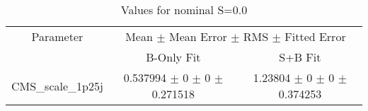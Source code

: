 \begin{table}
\centering
\caption{Values for nominal S=0.0}
\begin{tabular}{ccc}
\toprule
Parameter & \multicolumn{2}{c}{Mean $\pm$ Mean Error $\pm$ RMS $\pm$ Fitted Error}\\
 & B-Only Fit & S+B Fit\\
\midrule
CMS\_scale\_1p25j & \num{0.537994} $\pm$ \num{0} $\pm$ \num{0} $\pm$ \num{0.271518} & \num{1.23804} $\pm$ \num{0} $\pm$ \num{0} $\pm$ \num{0.374253}\\
\bottomrule
\end{tabular}
\end{table}